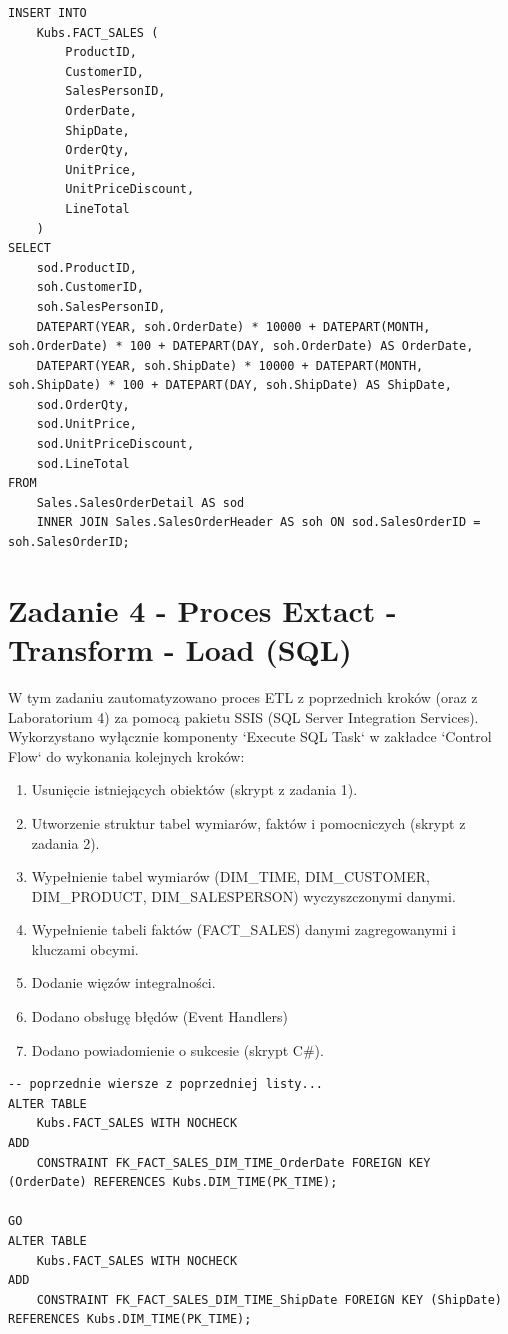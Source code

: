 \documentclass[a4paper,12pt]{article}
\begin{document}
\begin{lstlisting}[caption={Przykład czyszczenia danych w instrukcji SELECT.}, label=lst:zad3_cleanse_example]
INSERT INTO
    Kubs.FACT_SALES (
        ProductID,
        CustomerID,
        SalesPersonID,
        OrderDate,
        ShipDate,
        OrderQty,
        UnitPrice,
        UnitPriceDiscount,
        LineTotal
    )
SELECT
    sod.ProductID,
    soh.CustomerID,
    soh.SalesPersonID,
    DATEPART(YEAR, soh.OrderDate) * 10000 + DATEPART(MONTH, soh.OrderDate) * 100 + DATEPART(DAY, soh.OrderDate) AS OrderDate,
    DATEPART(YEAR, soh.ShipDate) * 10000 + DATEPART(MONTH, soh.ShipDate) * 100 + DATEPART(DAY, soh.ShipDate) AS ShipDate,
    sod.OrderQty,
    sod.UnitPrice,
    sod.UnitPriceDiscount,
    sod.LineTotal
FROM
    Sales.SalesOrderDetail AS sod
    INNER JOIN Sales.SalesOrderHeader AS soh ON sod.SalesOrderID = soh.SalesOrderID;
\end{lstlisting}

\section{Zadanie 4 - Proces Extact - Transform - Load (SQL)}

W tym zadaniu zautomatyzowano proces ETL z poprzednich kroków (oraz z Laboratorium 4) za pomocą pakietu SSIS (SQL Server Integration Services). Wykorzystano wyłącznie komponenty `Execute SQL Task` w zakładce `Control Flow` do wykonania kolejnych kroków:
\begin{enumerate}
    \item Usunięcie istniejących obiektów (skrypt z zadania 1).
    \item Utworzenie struktur tabel wymiarów, faktów i pomocniczych (skrypt z zadania 2).
    \item Wypełnienie tabel wymiarów (DIM\_TIME, DIM\_CUSTOMER, DIM\_PRODUCT, DIM\_SALESPERSON) wyczyszczonymi danymi.
    \item Wypełnienie tabeli faktów (FACT\_SALES) danymi zagregowanymi i kluczami obcymi.
    \item Dodanie więzów integralności.
    \item Dodano obsługę błędów (Event Handlers)
    \item Dodano powiadomienie o sukcesie (skrypt C\#).
\end{enumerate}

\begin{lstlisting}[caption={Dodanie nowych CONSTRAINT}]
-- poprzednie wiersze z poprzedniej listy...
ALTER TABLE
    Kubs.FACT_SALES WITH NOCHECK
ADD
    CONSTRAINT FK_FACT_SALES_DIM_TIME_OrderDate FOREIGN KEY (OrderDate) REFERENCES Kubs.DIM_TIME(PK_TIME);

GO
ALTER TABLE
    Kubs.FACT_SALES WITH NOCHECK
ADD
    CONSTRAINT FK_FACT_SALES_DIM_TIME_ShipDate FOREIGN KEY (ShipDate) REFERENCES Kubs.DIM_TIME(PK_TIME);
\end{lstlisting}
\end{document}
